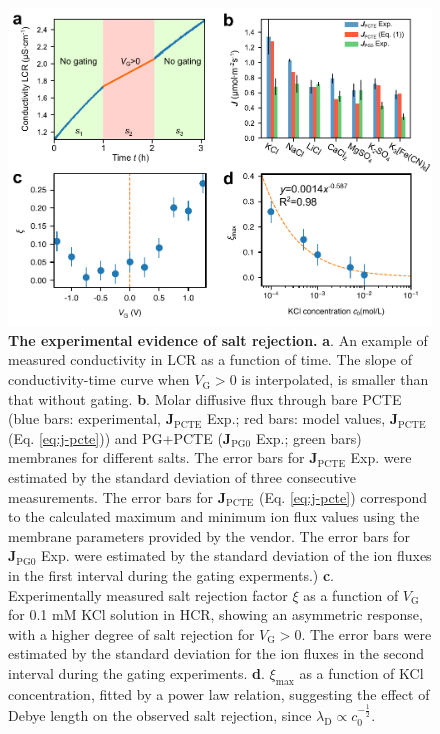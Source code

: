 \documentclass[journal=nalefd,email=true, hyperref=true, keywords=false]{achemso}
\renewcommand*{\textcolor}[2]{#2}
\begin{document}
\begin{figure}[H]
  \centering
  \includegraphics[width=0.95\linewidth]{img/fig2.pdf}
  \caption{ \textbf{The experimental evidence of salt rejection.}
    \textbf{a}. An example of measured conductivity in LCR as a
    function of time. The slope of conductivity-time curve when
    $V_{\mathrm{G}}>0$ is interpolated, is smaller than that without
    gating. \textbf{b}. Molar diffusive flux through bare PCTE (blue
    bars: experimental, $\boldsymbol{J}_{\mathrm{PCTE}}$ Exp.; red
    bars: model values, $\boldsymbol{J}_{\mathrm{PCTE}}$
    (Eq. \ref{eq:j-pcte})) and PG+PCTE
    ($\boldsymbol{J}_{\mathrm{PG0}}$ Exp.; green bars) membranes for
    different salts. \textcolor{blue}{The error bars for
      $\boldsymbol{J}_{\mathrm{PCTE}}$ Exp. were estimated by the
      standard deviation of three consecutive measurements. The error bars
      for $\boldsymbol{J}_{\mathrm{PCTE}}$ (Eq. \ref{eq:j-pcte})
      correspond to the calculated maximum and minimum ion flux values
      using the membrane parameters provided by the vendor. The error
      bars for $\boldsymbol{J}_{\mathrm{PG0}}$ Exp. were estimated by
      the standard deviation of the ion fluxes in the first interval
      during the gating experments.)}  \textbf{c}. Experimentally
    measured salt rejection factor $\xi$ as a function of
    $V_{\mathrm{G}}$ for 0.1 mM KCl solution in HCR, showing an
    asymmetric response, with a higher degree of salt rejection for
    $V_{\mathrm{G}}>0$. \textcolor{blue}{The error bars were estimated
      by the standard deviation for the ion fluxes in the second
      interval during the gating experiments.}
    \textbf{d}. $\xi_{\mathrm{max}}$ as a function of KCl
    concentration, fitted by a power law relation, suggesting the
    effect of Debye length on the observed salt rejection, since
    $\lambda_{\mathrm{D}} \propto c_{0}^{-\frac{1}{2}}$.}
  \label{fig:2} 
\end{figure}
\end{document}
